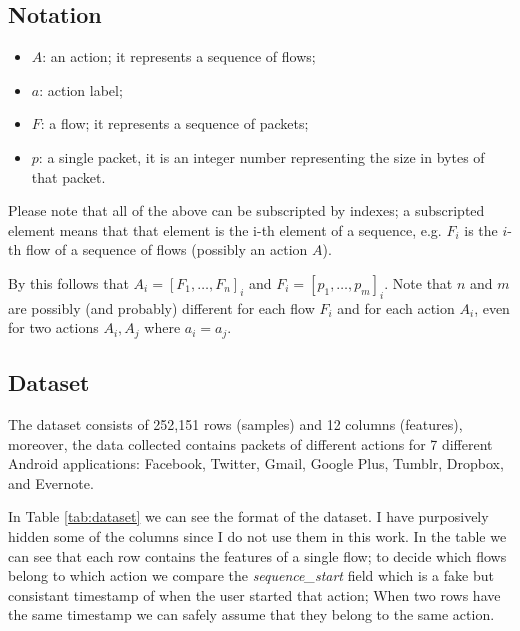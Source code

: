 \subsection{Notation}
\label{subsec:notation}
\begin{itemize}
 \item $ A $: an action; it represents a sequence of flows;
 \item $ a $: action label;
 \item $ F $: a flow; it represents a sequence of packets;
 \item $ p $: a single packet, it is an integer number representing the size in bytes of that packet.
\end{itemize}

Please note that all of the above can be subscripted by indexes; a subscripted element means that that element is the i-th element of a sequence, e.g. $F_i$ is the $i$-th flow of a sequence of flows (possibly an action $A$).
 
By this follows that $A_i = [F_1, \dots, F_n]_i$ and $F_i = [p_1,\dots, p_m]_i$. Note that $n$ and $m$ are possibly (and probably) different for each flow $F_i$ and for each action $A_i$, even for two actions $A_i, A_j$ where $a_i = a_j$.

\subsection{Dataset}
The dataset consists of 252,151 rows (samples) and 12 columns (features), moreover, the data collected contains packets of different actions for 7 different Android applications: Facebook, Twitter, Gmail, Google Plus, Tumblr, Dropbox, and Evernote. 

In Table \ref{tab:dataset} we can see the format of the dataset. I have purposively hidden some of the columns since I do not use them in this work. In the table we can see that each row contains the features of a single flow; to decide which flows belong to which action we compare the \textit{sequence\_start} field which is a fake but consistant timestamp of when the user started that action; When two rows have the same timestamp we can safely assume that they belong to the same action.


